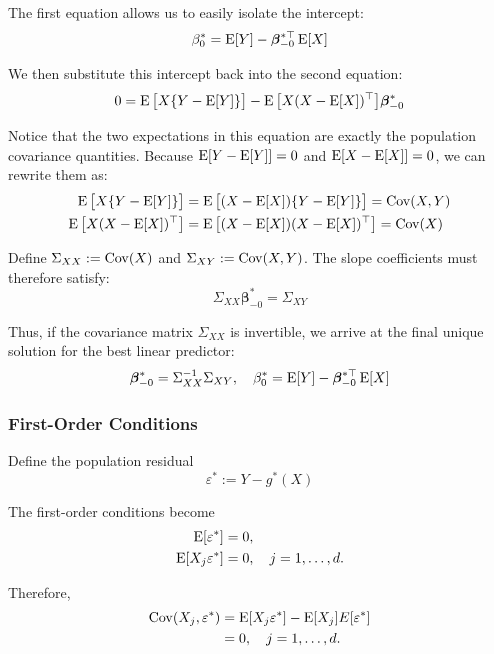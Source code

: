 The first equation allows us to easily isolate the intercept:
\begin{equation*}
    \beta_0^* = \operatorname{E}[Y] - \bm\beta_{-0}^{*\top}\operatorname{E}[X]
\end{equation*}

We then substitute this intercept back into the second equation:
\begin{equation*}
    0 = \operatorname{E}\big[X\{Y - \operatorname{E}[Y]\}\big] - \operatorname{E}\big[X(X - \operatorname{E}[X])^\top\big]\bm\beta_{-0}^*
\end{equation*}

Notice that the two expectations in this equation are exactly the population covariance quantities. Because $\operatorname{E}[Y - \operatorname{E}[Y]] = 0$ and $\operatorname{E}[X - \operatorname{E}[X]] = 0$, we can rewrite them as:
\begin{align*}
    \operatorname{E}\big[X\{Y - \operatorname{E}[Y]\}\big] &= \operatorname{E}\big[(X - \operatorname{E}[X])\{Y - \operatorname{E}[Y]\}\big] = \operatorname{Cov}(X,Y) \\
    \operatorname{E}\big[X(X - \operatorname{E}[X])^\top\big] &= \operatorname{E}\big[(X - \operatorname{E}[X])(X - \operatorname{E}[X])^\top\big] = \operatorname{Cov}(X)
\end{align*}

Define $\Sigma_{XX} := \operatorname{Cov}(X)$ and $\Sigma_{XY} := \operatorname{Cov}(X,Y)$. The slope coefficients must therefore satisfy:
\begin{equation*}
    \Sigma_{XX}\bm\beta_{-0}^* = \Sigma_{XY}
\end{equation*}

Thus, if the covariance matrix $\Sigma_{XX}$ is invertible, we arrive at the final unique solution for the best linear predictor:
\begin{equation*}
    \bm\beta_{-0}^* = \Sigma_{XX}^{-1}\Sigma_{XY}, \quad \beta_0^* = \operatorname{E}[Y] - \bm\beta_{-0}^{*\top}\operatorname{E}[X]
\end{equation*}

\subsubsection{First-Order Conditions}
Define the population residual
\begin{equation*}
    \varepsilon^*:=Y-g^*(X)
\end{equation*}

The first-order conditions become
\begin{align*}
    \operatorname{E}[\varepsilon^*] &= 0, \\
    \operatorname{E}[X_j\varepsilon^*] &=0, \quad j=1,\dots,d.
\end{align*}

Therefore,
\begin{align*}
    \operatorname{Cov}(X_j,\varepsilon^*) &= \operatorname{E}[X_j\varepsilon^*]-\operatorname{E}[X_j]E[\varepsilon^*] \\
    &= 0, \quad j=1,\dots,d.
\end{align*}

